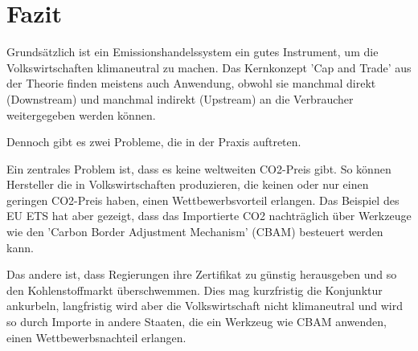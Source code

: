 \chapter{Fazit}

Grundsätzlich ist ein Emissionshandelssystem ein gutes Instrument, um die Volkswirtschaften klimaneutral zu machen. 
Das Kernkonzept 'Cap and Trade' aus der Theorie finden meistens auch Anwendung, obwohl sie manchmal direkt (Downstream) und manchmal indirekt (Upstream) an die Verbraucher weitergegeben werden können. 

Dennoch gibt es zwei Probleme, die in der Praxis auftreten. 

Ein zentrales Problem ist, dass es keine weltweiten CO2-Preis gibt. 
So können Hersteller die in Volkswirtschaften produzieren, die keinen oder nur einen geringen CO2-Preis haben, einen Wettbewerbsvorteil erlangen.
Das Beispiel des EU ETS hat aber gezeigt, dass das Importierte CO2 nachträglich über Werkzeuge wie den 'Carbon Border Adjustment Mechanism' (CBAM) besteuert werden kann.

Das andere ist, dass Regierungen ihre Zertifikat zu günstig herausgeben und so den Kohlenstoffmarkt überschwemmen. 
Dies mag kurzfristig die Konjunktur ankurbeln, langfristig wird aber die Volkswirtschaft nicht klimaneutral und wird so durch Importe in andere Staaten, die ein Werkzeug wie CBAM anwenden, einen Wettbewerbsnachteil erlangen.
